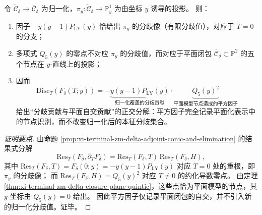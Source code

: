 \begin{corollary}[判别式分解中平方因子的几何来源]\label{cor:xi-terminal-zm-delta-discriminant-square-geometry}
令 \(\widetilde{\mathcal C}_\delta\to\overline{\mathcal C}_\delta\) 为归一化，\(\pi_y:\widetilde{\mathcal C}_\delta\to\mathbb P^1_y\) 为由坐标 \(y\) 诱导的投影。
则：
\begin{enumerate}
  \item 因子 \(-y(y-1)P_{\mathrm{LY}}(y)\) 恰给出 \(\pi_y\) 的分歧像（有限分歧值），对应于 \(T=0\) 的分支；
  \item 多项式 \(Q_{5}(y)\) 的零点不对应 \(\pi_y\) 的分歧值，而对应于平面闭包 \(\overline{\mathcal C}_\delta\subset\mathbb P^{2}\) 的五个节点在 \(y\)-直线上的投影；
  \item 因而
  \[
  \mathrm{Disc}_{T}(F_\delta(T;y))
  =-\underbrace{y(y-1)P_{\mathrm{LY}}(y)}_{\text{归一化覆盖的分歧贡献}}
  \cdot
  \underbrace{Q_{5}(y)^{2}}_{\text{平面模型节点造成的平方因子}}
  \]
  给出“分歧贡献与平面自交贡献”的正交分解：平方因子完全记录平面化表示中的节点识别，而不改变归一化后的本征分歧集合。
\end{enumerate}
\end{corollary}

\begin{proof}[证明要点]
由命题 \ref{prop:xi-terminal-zm-delta-adjoint-conic-and-elimination} 的结果式分解
\[
\mathrm{Res}_{T}(F_\delta,\partial_TF_\delta)
=\mathrm{Res}_{T}(F_\delta,T)\,\mathrm{Res}_{T}(F_\delta,H),
\]
其中 \(\mathrm{Res}_{T}(F_\delta,T)=F_\delta(0;y)=-y(y-1)P_{\mathrm{LY}}(y)\) 对应 \(T=0\) 处的重根，即 \(\pi_y\) 的分歧像；
而 \(\mathrm{Res}_{T}(F_\delta,H)=Q_5(y)^2\) 对应 \(T\neq 0\) 的约化导数零点。
由定理 \ref{thm:xi-terminal-zm-delta-closure-plane-quintic}，这些点恰为平面模型的节点，其 \(y\)-坐标由 \(Q_5(y)=0\) 给出。
因此平方因子仅记录平面闭包的自交，并不引入新的归一化分歧值。证毕。
\end{proof}

